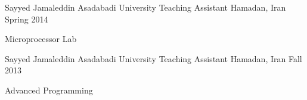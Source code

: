 \begin{cventries}
  \cventry
    {Sayyed Jamaleddin Asadabadi University} 
    {Teaching Assistant}
    {Hamadan, Iran} 
    {Spring 2014} 
    {
      \begin{cvitems} 
        \item {Microprocessor Lab}
      \end{cvitems}
    }

  \cventry
    {Sayyed Jamaleddin Asadabadi University} %
    {Teaching Assistant} %
    {Hamadan, Iran} %
    {Fall 2013} %
    {
      \begin{cvitems} %
        \item {Advanced Programming}
      \end{cvitems}
    }

\end{cventries}
